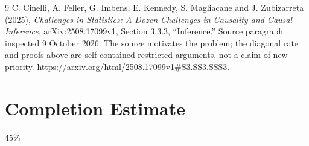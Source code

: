 \documentclass[11pt]{article}
\theoremstyle{remark}
\begin{document}
\begin{thebibliography}{9}
 C. Cinelli, A. Feller, G. Imbens, E. Kennedy, S. Magliacane and J. Zubizarreta (2025), \emph{Challenges in Statistics: A Dozen Challenges in Causality and Causal Inference}, arXiv:2508.17099v1, Section 3.3.3, ``Inference.'' Source paragraph inspected 9 October 2026. The source motivates the problem; the diagonal rate and proofs above are self-contained restricted arguments, not a claim of new priority. \url{https://arxiv.org/html/2508.17099v1#S3.SS3.SSS3}.
\end{thebibliography}

\section{Completion Estimate}
45\%
\end{document}
